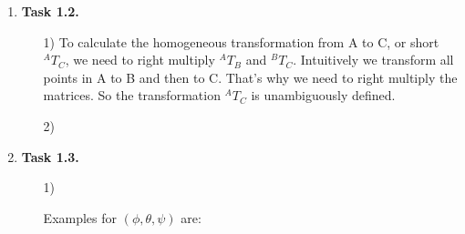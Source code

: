 \documentclass[a4paper,11pt]{article}
\begin{document}
\begin {enumerate}
\begin{enumerate}
        $$
            A_1 \approx \begin{pmatrix}-0.8839 \\ -5.2398 \\ -4.6651\end{pmatrix},
            B_1 \approx \begin{pmatrix}7.0076 \\ -0.8839 \\ -0.3349\end{pmatrix},
            C_1 \approx \begin{pmatrix}0.8839 \\ 5.2398 \\ 4.6651\end{pmatrix},
            D_1 \approx \begin{pmatrix}-7.0076 \\ 0.8839 \\ 0.3349\end{pmatrix},
            E_1 \approx \begin{pmatrix}-1.4210 \\ -19.7922 \\ 22.5000\end{pmatrix}
        $$

    \end{enumerate}

\item[\textbf{Task 1.2.}]

    \begin{enumerate}
        \item[1)] To calculate the homogeneous transformation from A to C, or short $^{A}T_{C}$, we need to right multiply $^{A}T_{B}$ and $^{B}T_{C}$. Intuitively we transform all points in A to B and then to C. That's why we need to right multiply the matrices. So the transformation $^{A}T_{C}$ is unambiguously defined.
        \item[2)]
    \end{enumerate}

\item[\textbf{Task 1.3.}]

    \begin{enumerate}
        \item[1)]

            Examples for $(\phi, \theta, \psi)$ are:


\end{enumerate}
\end{enumerate}
\end{document}
